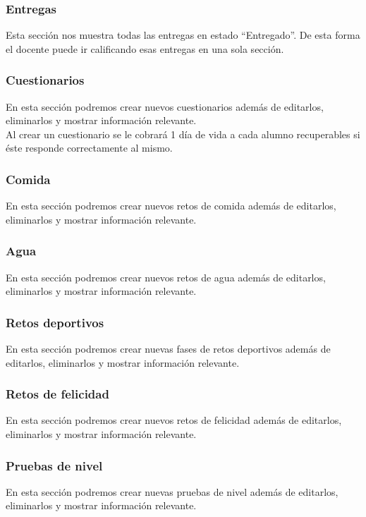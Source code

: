 \subsubsection{Entregas}
Esta sección nos muestra todas las entregas en estado ``Entregado''. De esta forma el docente puede ir calificando esas entregas en una sola sección.

\subsubsection{Cuestionarios}
En esta sección podremos crear nuevos cuestionarios además de editarlos, eliminarlos y mostrar información relevante.\\

Al crear un cuestionario se le cobrará 1 día de vida a cada alumno recuperables si éste responde correctamente al mismo.

\subsubsection{Comida}
En esta sección podremos crear nuevos retos de comida además de editarlos, eliminarlos y mostrar información relevante.\\

\subsubsection{Agua}
En esta sección podremos crear nuevos retos de agua además de editarlos, eliminarlos y mostrar información relevante.\\

\subsubsection{Retos deportivos}
En esta sección podremos crear nuevas fases de retos deportivos además de editarlos, eliminarlos y mostrar información relevante.\\

\subsubsection{Retos de felicidad}
En esta sección podremos crear nuevos retos de felicidad además de editarlos, eliminarlos y mostrar información relevante.\\

\subsubsection{Pruebas de nivel}
En esta sección podremos crear nuevas pruebas de nivel además de editarlos, eliminarlos y mostrar información relevante.\\

